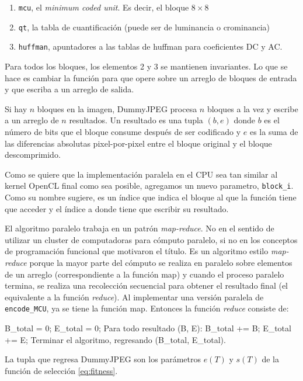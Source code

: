 \begin{enumerate}
    \item \verb+mcu+, el \emph{minimum coded unit}. Es decir, el bloque
        $8\times8$
    \item \verb+qt+, la tabla de cuantificación (puede ser de luminancia o
        crominancia)
    \item \verb+huffman+, apuntadores a las tablas de huffman para coeficientes
        DC y AC.
\end{enumerate}

Para todos los bloques, los elementos 2 y 3 se mantienen invariantes. Lo que se
hace es cambiar la función para que opere sobre un arreglo de bloques de
entrada y que escriba a un arreglo de salida.

Si hay $n$ bloques en la imagen, DummyJPEG procesa $n$ bloques a la vez y
escribe a un arreglo de $n$ resultados. Un resultado es una tupla $(b, e)$
donde $b$ es el número de bits que el bloque consume después de ser codificado
y $e$ es la suma de las diferencias absolutas pixel-por-pixel entre el bloque
original y el bloque descomprimido.

Como se quiere que la implementación paralela en el CPU sea tan similar al
kernel OpenCL final como sea posible, agregamos un nuevo parametro,
\verb+block_i+. Como su nombre sugiere, es un índice que indica el bloque al
que la función tiene que acceder y el índice a donde tiene que escribir su
resultado.

El algoritmo paralelo trabaja en un patrón \emph{map-reduce}. No en el sentido
de utilizar un cluster de computadoras para cómputo paralelo, si no en los
conceptos de programación funcional que motivaron el título. Es un algoritmo
estilo \emph{map-reduce} porque la mayor parte del cómputo se realiza en
paralelo sobre elementos de un arreglo (correspondiente a la función map) y
cuando el proceso paralelo termina, se realiza una recolección secuencial para
obtener  el resultado final (el equivalente a la función \emph{reduce}). Al implementar una
versión paralela de \verb+encode_MCU+, ya se tiene la función map. Entonces la
función \emph{reduce} consiste de:

\label{alg:mcu_paralelo}
\begin{code}
    B_total = 0;
    E_total = 0;
    Para todo resultado (B, E):
       B_total += B;
       E_total += E;
    Terminar el algoritmo, regresando (B_total, E_total).
\end{code}

La tupla que regresa DummyJPEG son los parámetros $e(T)$ y $s(T)$ de la función de selección
\ref{eq:fitness}.

